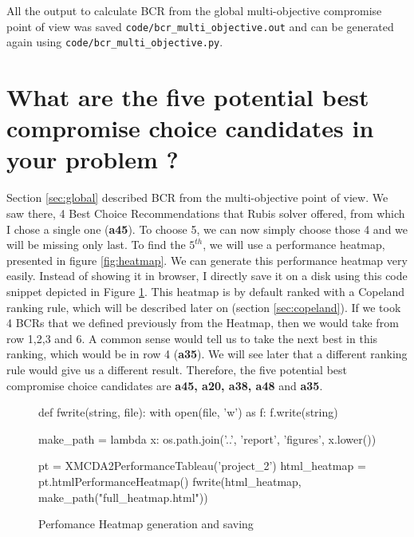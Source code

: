 \documentclass[a4paper]{article}
\begin{document}
All the output to calculate BCR from the global multi-objective compromise point of view was saved \texttt{code/bcr\_multi\_objective.out} and can be generated again using \texttt{code/bcr\_multi\_objective.py}.

\section{What are the five potential best compromise choice candidates in your problem ?}

Section \ref{sec:global} described BCR from the multi-objective point of view. We saw there, 4 Best Choice Recommendations that Rubis solver offered, from which I chose a single one (\textbf{a45}). To choose 5, we can now simply choose those 4 and we will be missing only last. To find the $5^{th}$, we will use a performance heatmap, presented in figure \ref{fig:heatmap}. We can generate this performance heatmap very easily. Instead of showing it in browser, I directly save it on a disk using this code snippet depicted in Figure \ref{lst:html}. This heatmap is by default ranked with a Copeland ranking rule, which will be described later on (section \ref{sec:copeland}). If we took 4 BCRs that we defined previously from the Heatmap, then we would take from row 1,2,3 and 6. A common sense would tell us to take the next best in this ranking, which would be in row 4 (\textbf{a35}). We will see later that a different ranking rule would give us a different result. Therefore, the five potential best compromise choice candidates are \textbf{a45, a20, a38, a48} and \textbf{a35}.
\begin{figure}[H]
	\begin{center}
		\begin{python}
def fwrite(string, file):
  with open(file, 'w') as f:
    f.write(string)
    
make_path = lambda x: os.path.join('..', 'report', 'figures', x.lower())

pt = XMCDA2PerformanceTableau('project_2')
html_heatmap = pt.htmlPerformanceHeatmap()
fwrite(html_heatmap, make_path("full_heatmap.html"))    
		\end{python}
	\end{center}
	\caption{Perfomance Heatmap generation and saving}
	\label{lst:html}
\end{figure}
\end{document}

